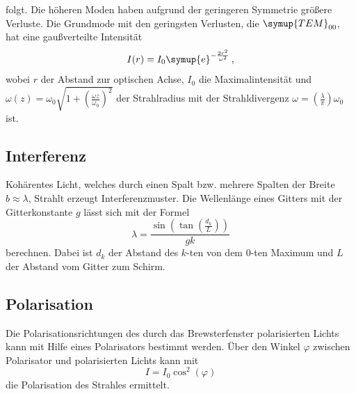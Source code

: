 folgt. Die höheren Moden haben aufgrund der geringeren Symmetrie größere Verluste.
Die Grundmode  mit den geringsten Verlusten, die $\symup{TEM}_{00}$, hat eine gaußverteilte Intensität
\begin{equation}
    I(r) = I_0 \symup{e}^{-\frac{2r^2}{\omega^2}} \, \text{,}
    \label{eqn:tem00}
\end{equation}
wobei $r$ der Abstand zur optischen Achse, $I_0$ die Maximalintensität
und $\omega(z) = \omega_0 \sqrt{1+(\frac{\omega z}{\omega_0})^2}$ der Strahlradius mit der Strahldivergenz $\omega = (\frac{\lambda}{\pi}) \omega_0$ ist.

\subsection{Interferenz}
Kohärentes Licht, welches durch einen Spalt bzw. mehrere Spalten der Breite $b \approx \lambda$, Strahlt erzeugt Interferenzmuster.
Die Wellenlänge eines Gitters mit der Gitterkonstante $g$ lässt sich mit der Formel
\begin{equation}
    \lambda = \frac{\sin(\tan(\frac{d_k}{L}))}{g k}
    \label{eqn:gitter}
\end{equation}
berechnen. Dabei ist $d_k$ der Abstand des $k$-ten von dem $0$-ten Maximum und $L$ der Abstand vom Gitter zum Schirm.

\subsection{Polarisation}
Die Polarisationsrichtungen des durch das Brewsterfenster polarisierten Lichts kann mit Hilfe eines Polarisators bestimmt werden.
Über den Winkel $\varphi$ zwischen Polarisator und polarisierten Lichts kann mit
\begin{equation}
    I = I_0 \cos^2(\varphi)
    \label{eqn:polar}
\end{equation}
die Polarisation des Strahles ermittelt.
